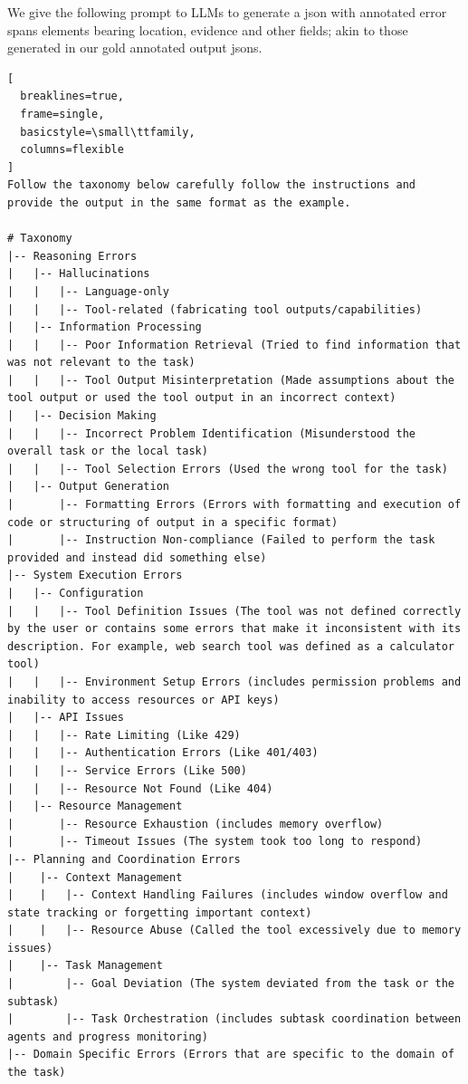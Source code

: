 \documentclass[11pt]{article}
\begin{document}
We give the following prompt to LLMs to generate a json with annotated error spans elements bearing location, evidence and other fields; akin to those generated in our gold annotated output jsons.
\begin{lstlisting}[
  breaklines=true,
  frame=single,
  basicstyle=\small\ttfamily,
  columns=flexible
]
Follow the taxonomy below carefully follow the instructions and provide the output in the same format as the example.

# Taxonomy
|-- Reasoning Errors
|   |-- Hallucinations
|   |   |-- Language-only
|   |   |-- Tool-related (fabricating tool outputs/capabilities)
|   |-- Information Processing
|   |   |-- Poor Information Retrieval (Tried to find information that was not relevant to the task)
|   |   |-- Tool Output Misinterpretation (Made assumptions about the tool output or used the tool output in an incorrect context)
|   |-- Decision Making
|   |   |-- Incorrect Problem Identification (Misunderstood the overall task or the local task)
|   |   |-- Tool Selection Errors (Used the wrong tool for the task)
|   |-- Output Generation
|       |-- Formatting Errors (Errors with formatting and execution of code or structuring of output in a specific format)
|       |-- Instruction Non-compliance (Failed to perform the task provided and instead did something else)
|-- System Execution Errors
|   |-- Configuration
|   |   |-- Tool Definition Issues (The tool was not defined correctly by the user or contains some errors that make it inconsistent with its description. For example, web search tool was defined as a calculator tool)
|   |   |-- Environment Setup Errors (includes permission problems and inability to access resources or API keys)
|   |-- API Issues
|   |   |-- Rate Limiting (Like 429)
|   |   |-- Authentication Errors (Like 401/403)
|   |   |-- Service Errors (Like 500)
|   |   |-- Resource Not Found (Like 404)
|   |-- Resource Management
|       |-- Resource Exhaustion (includes memory overflow)
|       |-- Timeout Issues (The system took too long to respond)
|-- Planning and Coordination Errors
|    |-- Context Management
|    |   |-- Context Handling Failures (includes window overflow and state tracking or forgetting important context)
|    |   |-- Resource Abuse (Called the tool excessively due to memory issues)
|    |-- Task Management
|        |-- Goal Deviation (The system deviated from the task or the subtask)
|        |-- Task Orchestration (includes subtask coordination between agents and progress monitoring)
|-- Domain Specific Errors (Errors that are specific to the domain of the task)


\end{lstlisting}
\end{document}
